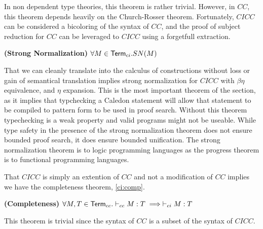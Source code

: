 In non dependent type theories, this theorem is rather trivial.  However, in $CC$, this theorem depends heavily on the Church-Rosser 
theorem.  Fortunately, $CICC$ can be considered a bicoloring of the syntax of $CC$, and the proof of subject reduction 
for $CC$ can be leveraged to $CICC$ using a forgetfull extraction.

\begin{theorem}
\textbf{(Strong Normalization)} $\forall M \in \mathsf{Term}_{ci}. SN(M)$
\label{ci:sn}
\end{theorem}

That we can cleanly translate into the calculus of constructions without loss or gain of 
semantical translation implies strong normalization for $CICC$ with $\beta\eta$ equivalence, 
and $\eta$ expansion.  This is the most important theorem of the section, as it implies that typchecking a Caledon 
statement will allow that statement to be compiled to pattern form to be used in proof search.  
Without this theorem typechecking is a weak property and valid programs might not be useable.  
While type safety in the presence of the strong normalization theorem does not ensure bounded proof search, 
it does ensure bounded unification.
The strong normalization theorem is to logic programming languages as 
the progress theorem is to functional programming languages.

That $CICC$ is simply an extention of $CC$ and not a modification of $CC$ implies we have the completeness theorem, \ref{ci:comp}.

\begin{theorem}
\textbf{(Completeness)}  $\forall M,T \in \mathsf{Term}_{cc}. \vdash_{cc} M : T \implies \vdash_{ci} M : T$
\label{ci:comp}
\end{theorem}

This theorem is trivial since the syntax of $CC$ is a subset of the syntax of $CICC$.
